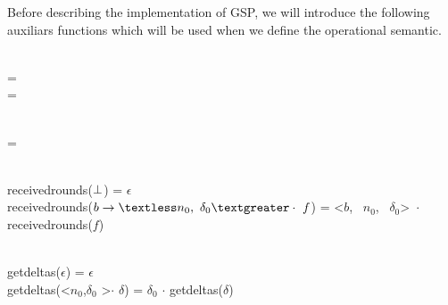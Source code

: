 \documentclass[envcountsect,runningheads,orivec]{llncs}
\begin{document}
Before describing the implementation of GSP, we will introduce the following auxiliars functions which will be used when we define the operational semantic.

\footnotesize
\ttfamily


\begin{flushleft}
 \\
\append{\gssegmentins{$\delta$}{\maxround}}{$\epsilon$} = \gssegmentins{$\delta$}{\maxround} \\
\append{\gssegmentins{$\delta$}{\maxround}}{$\headerround$:\tailround} =  
\end{flushleft}

\begin{flushleft}
 \\
 =  \gsprefixins{\applyplus{\state}{$\delta$ $\cdot$ $\epsilon$}}{\maxround[$\maxround'$]}  \\
\end{flushleft}

\begin{flushleft}
\\
receivedrounds($\perp$) = $\epsilon$ \\
receivedrounds($\partialfunction{b}{\textless n_0,\ \delta_0 \textgreater} \cdot\ f$) = \textless $b$, \ $n_0$, \ $\delta_0$\textgreater\ $\cdot$ receivedrounds($f$)
\end{flushleft}

\begin{flushleft}
\end{flushleft}


\begin{flushleft}
 \\
getdeltas($\epsilon$) = $\epsilon$ \\
getdeltas(\textless $n_0$,$\delta_0$ \textgreater $\cdot$ $\delta$) = $\delta_0$ $\cdot$ getdeltas($\delta$)\\
\end{flushleft}
\end{document}
